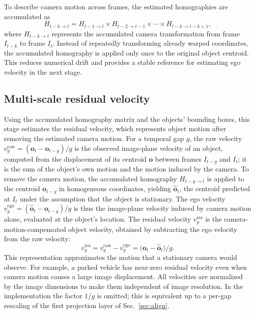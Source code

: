\documentclass{article}
\begin{document}
To describe camera motion across frames, the estimated homographies are accumulated as
\begin{equation}
  H_{t-k \to t} = H_{t-1 \to t} \times H_{t-2 \to t-1} \times \cdots \times H_{t-k \to t-k+1},
  \label{eq:cumulative}
\end{equation}
where $H_{t-k \to t}$ represents the accumulated camera transformation from frame $I_{t-k}$ to frame $I_t$. Instead of repeatedly transforming already warped coordinates, the accumulated homography is applied only once to the original object centroid. This reduces numerical drift and provides a stable reference for estimating ego velocity in the next stage.

\subsection{Multi-scale residual velocity}
\label{sec:residual}
Using the accumulated homography matrix and the objects' bounding boxes, this stage estimates the residual velocity, which represents object motion after removing the estimated camera motion. For a temporal gap $g$, the raw velocity $v^{\mathrm{raw}}_{g} = (\boldsymbol{o}_{t}-\boldsymbol{o}_{t-g})/g$ is the observed image-plane velocity of an object, computed from the displacement of its centroid $\boldsymbol{o}$ between frames $I_{t-g}$ and $I_{t}$; it is the sum of the object's own motion and the motion induced by the camera. To remove the camera motion, the accumulated homography $H_{t-g \to t}$ is applied to the centroid $\boldsymbol{o}_{t-g}$ in homogeneous coordinates, yielding $\hat{\boldsymbol{o}}_{t}$, the centroid predicted at $I_{t}$ under the assumption that the object is stationary. The ego velocity $v^{\mathrm{ego}}_{g} = (\hat{\boldsymbol{o}}_{t}-\boldsymbol{o}_{t-g})/g$ is thus the image-plane velocity induced by camera motion alone, evaluated at the object's location. The residual velocity $v^{\mathrm{res}}_{g}$ is the camera-motion-compensated object velocity, obtained by subtracting the ego velocity from the raw velocity:
\begin{equation}
  v^{\mathrm{res}}_{g} = v^{\mathrm{raw}}_{g} - v^{\mathrm{ego}}_{g} = \bigl(\boldsymbol{o}_{t}-\hat{\boldsymbol{o}}_{t}\bigr)/g.
  \label{eq:residual}
\end{equation}
This representation approximates the motion that a stationary camera would observe. For example, a parked vehicle has near-zero residual velocity even when camera motion causes a large image displacement. All velocities are normalized by the image dimensions to make them independent of image resolution. In the implementation the factor $1/g$ is omitted; this is equivalent up to a per-gap rescaling of the first projection layer of Sec.~\ref{sec:align}.
\end{document}
